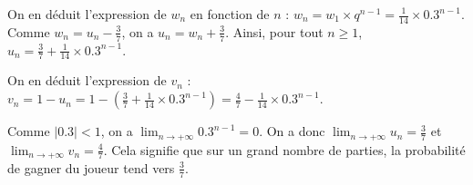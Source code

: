 {\begin{enumerate}
{			On en déduit l'expression de $w_n$ en fonction de $n$ : $w_n = w_1 \times q^{n-1} = \frac{1}{14} \times 0.3^{n-1}$.
			Comme $w_n = u_n - \frac{3}{7}$, on a $u_n = w_n + \frac{3}{7}$.
			Ainsi, pour tout $n \geqslant 1$, $u_n = \frac{3}{7} + \frac{1}{14} \times 0.3^{n-1}$.
			
			On en déduit l'expression de $v_n$ :
			$v_n = 1 - u_n = 1 - \left(\frac{3}{7} + \frac{1}{14} \times 0.3^{n-1}\right) = \frac{4}{7} - \frac{1}{14} \times 0.3^{n-1}$.
			
			Comme $|0.3| < 1$, on a $\lim_{n \to +\infty} 0.3^{n-1} = 0$.
			On a donc $\lim_{n \to +\infty} u_n = \frac{3}{7}$ et $\lim_{n \to +\infty} v_n = \frac{4}{7}$. Cela signifie que sur un grand nombre de parties, la probabilité de gagner du joueur tend vers $\frac{3}{7}$. 
		}
	\end{enumerate}
}

